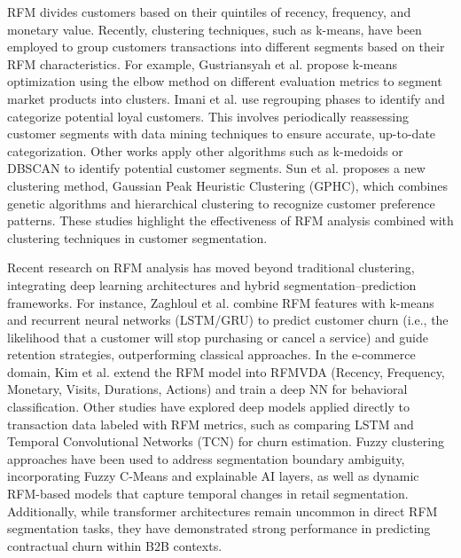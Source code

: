 \documentclass{ws-ijitdm}
\begin{document}

RFM divides customers based on their quintiles of recency, frequency, and monetary value\cite{1}. Recently, clustering techniques, such as k-means, have been employed to group customers transactions into different segments based on their RFM characteristics\cite{3}.  For example, Gustriansyah et al.\cite{23} propose k-means optimization using the elbow method on different evaluation metrics to segment market products into clusters. Imani et al.\cite{24} use regrouping phases to identify and categorize potential loyal customers. This involves periodically reassessing customer segments with data mining techniques to ensure accurate, up-to-date categorization. Other works apply other algorithms such as k-medoids or DBSCAN to identify potential customer segments\cite{5,25}. Sun et al.\cite{26} proposes a new clustering method, Gaussian Peak Heuristic Clustering (GPHC), which combines genetic algorithms and hierarchical clustering to recognize customer preference patterns. These studies highlight the effectiveness of RFM analysis combined with clustering techniques in customer segmentation.

{\color{black}Recent research on RFM analysis has moved beyond traditional clustering, integrating deep learning architectures and hybrid segmentation–prediction frameworks. For instance, Zaghloul et al.\cite{zaghloul2025rfm} combine RFM features with k-means and recurrent neural networks (LSTM/GRU) to predict customer churn (i.e., the likelihood that a customer will stop purchasing or cancel a service) and guide retention strategies, outperforming classical approaches. In the e-commerce domain, Kim et al.\cite{kim2025rfmvda} extend the RFM model into RFMVDA (Recency, Frequency, Monetary, Visits, Durations, Actions) and train a deep NN for behavioral classification. Other studies have explored deep models applied directly to transaction data labeled with RFM metrics, such as comparing LSTM and Temporal Convolutional Networks (TCN) for churn estimation\cite{dharmasaguna2025churn}. Fuzzy clustering approaches have been used to address segmentation boundary ambiguity, incorporating Fuzzy C-Means and explainable AI layers\cite{marin2025fuzzyxai}, as well as dynamic RFM-based models that capture temporal changes in retail segmentation\cite{sobantu2024fuzzy}. Additionally, while transformer architectures remain uncommon in direct RFM segmentation tasks, they have demonstrated strong performance in predicting contractual churn within B2B contexts\cite{ahlstrand2025transformers}.}
\end{document}
